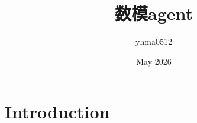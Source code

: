 \documentclass{article}
\title{数模agent}
\author{yhma0512 }
\date{May 2026}
\begin{document}
\maketitle

\section{Introduction}
\end{document}
